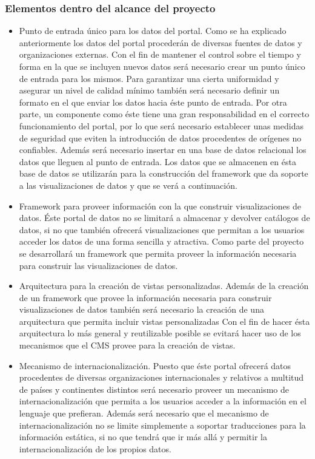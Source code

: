 \subsubsection{Elementos dentro del alcance del proyecto}
\begin{itemize}
\item Punto de entrada único para los datos del portal.  Como se ha explicado anteriormente los datos del portal procederán de diversas fuentes de datos y organizaciones externas.  Con el fin de mantener el control sobre el tiempo y forma en la que se incluyen nuevos datos será necesario crear un punto único de entrada para los mismos.  Para garantizar una cierta uniformidad y asegurar un nivel de calidad mínimo también será necesario definir un formato en el que enviar los datos hacia éste punto de entrada.\newline
Por otra parte, un componente como éste tiene una gran responsabilidad en el correcto funcionamiento del portal, por lo que será necesario establecer unas medidas de seguridad que eviten la introducción de datos procedentes de orígenes no confiables.\newline
Además será necesario insertar en una base de datos relacional los datos que lleguen al punto de entrada.  Los datos que se almacenen en ésta base de datos se utilizarán para la construcción del framework que da soporte a las visualizaciones de datos y que se verá a continuación.
\item Framework para proveer información con la que construir visualizaciones de datos.  Éste portal de datos no se limitará a almacenar y devolver catálogos de datos, si no que también ofrecerá visualizaciones que permitan a los usuarios acceder los datos de una forma sencilla y atractiva.  Como parte del proyecto se desarrollará un framework que permita proveer la información necesaria para construir las visualizaciones de datos.
\item Arquitectura para la creación de vistas personalizadas.  Además de la creación de un framework que provee la información necesaria para construir visualizaciones de datos también será necesario la creación de una arquitectura que permita incluir vistas personalizadas   Con el fin de hacer ésta arquitectura lo más general y reutilizable posible se evitará hacer uso de los mecanismos que el CMS provee para la creación de vistas.
\item Mecanismo de internacionalización.  Puesto que éste portal ofrecerá datos procedentes de diversas organizaciones internacionales y relativos a multitud de países y continentes distintos será necesario proveer un mecanismo de internacionalización que permita a los usuarios acceder a la información en el lenguaje que prefieran.  Además será necesario que el mecanismo de internacionalización no se limite simplemente a soportar traducciones para la información estática, si no que tendrá que ir más allá y permitir la internacionalización de los propios datos.

\end{itemize}
